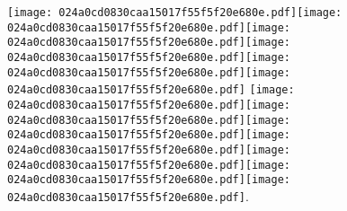 \documentclass{article}
\newcommand{\origpg}[2]{\texttt{[image: 024a0cd0830caa15017f55f5f20e680e.pdf]}}
\begin{document}
{\vspace{0.626pt}\origpg{13}{85.303pt 586.04pt 92.469pt 602.18pt}\hspace{0.291pt}\origpg{13}{92.759pt 586.04pt 99.926pt 602.18pt}\hspace{-0.178pt}\origpg{13}{99.748pt 586.04pt 107.59pt 602.18pt}\hspace{-0.129pt}\origpg{13}{107.46pt 586.04pt 115.53pt 602.18pt}\hspace{-0.355pt}\origpg{13}{115.18pt 586.04pt 123.81pt 602.18pt}\origpg{13}{123.81pt 586.04pt 132.03pt 602.18pt} \origpg{13}{136.13pt 586.04pt 143.29pt 602.18pt}\origpg{13}{143.34pt 586.04pt 151.98pt 602.18pt}\origpg{13}{151.98pt 586.04pt 159.14pt 602.18pt}\origpg{13}{159.23pt 586.04pt 166.28pt 602.18pt}\origpg{13}{166.21pt 586.04pt 173.38pt 602.18pt}\hspace{-0.178pt}\origpg{13}{173.2pt 586.04pt 183.42pt 602.18pt}\origpg{13}{183.32pt 586.04pt 194.17pt 602.18pt}. 


}
\end{document}
